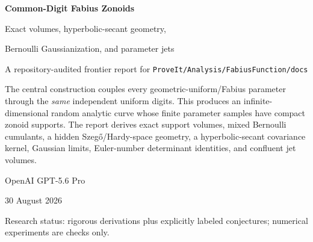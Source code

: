 \documentclass[11pt,a4paper]{article}
\theoremstyle{definition}
\theoremstyle{remark}
\newcommand{\repo}{\texttt{ProveIt/Analysis/FabiusFunction/docs}}
\begin{document}

\begin{titlepage}
\centering
\vspace*{1.4cm}
{\Huge\bfseries\color{deepblue} Common-Digit Fabius Zonoids\par}
\vspace{0.35cm}
{\LARGE Exact volumes, hyperbolic-secant geometry,\par}
{\LARGE Bernoulli Gaussianization, and parameter jets\par}
\vspace{0.8cm}
{\large A repository-audited frontier report for \repo\par}
\vspace{1.5cm}
\begin{tcolorbox}[width=0.88\textwidth,colback=warmgray,colframe=deepblue!55,boxrule=0.7pt,arc=1.5mm]
\centering
The central construction couples every geometric-uniform/Fabius parameter through the \emph{same} independent uniform digits.  This produces an infinite-dimensional random analytic curve whose finite parameter samples have compact zonoid supports.  The report derives exact support volumes, mixed Bernoulli cumulants, a hidden Szeg\H{o}/Hardy-space geometry, a hyperbolic-secant covariance kernel, Gaussian limits, Euler-number determinant identities, and confluent jet volumes.
\end{tcolorbox}
\vfill
{\large OpenAI GPT-5.6 Pro\par}
\vspace{0.2cm}
{\large 30 August 2026\par}
\vspace{0.7cm}
{\small Research status: rigorous derivations plus explicitly labeled conjectures; numerical experiments are checks only.\par}
\end{titlepage}
\clearpage
{}
\end{document}
